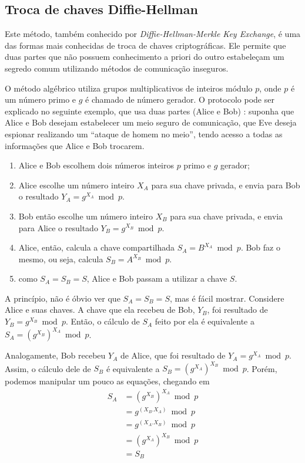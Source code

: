 
\subsection*{Troca de chaves Diffie-Hellman}

Este método, também conhecido por \emph{Diffie-Hellman-Merkle Key Exchange}, é uma das
formas mais conhecidas de troca de chaves criptográficas. Ele permite que duas partes
que não possuem conhecimento a priori do outro estabeleçam um segredo comum utilizando
métodos de comunicação inseguros.

O método algébrico utiliza grupos multiplicativos de inteiros módulo $p$, onde $p$ é um
número primo e $g$ é chamado de número gerador. O protocolo pode ser explicado no
seguinte exemplo, que usa duas partes (Alice e Bob)
\cite{book:schneier,artigo:diffiehellman}: suponha que Alice e Bob desejam estabelecer
um meio seguro de comunicação, que Eve deseja espionar realizando um ``ataque de homem
no meio'', tendo acesso a todas as informações que Alice e Bob trocarem.

\begin{enumerate}
    \item Alice e Bob escolhem dois números inteiros $p$ primo e $g$ gerador;

    \item Alice escolhe um número inteiro $X_{A}$ para sua chave privada, e envia para
        Bob o resultado $Y_{A} = g^{X_{A}} \bmod p$.

    \item Bob então escolhe um número inteiro $X_{B}$ para sua chave privada, e envia
        para Alice o resultado $Y_{B} = g^{X_{B}} \bmod p$.

    \item Alice, então, calcula a chave compartilhada $S_A = B^{X_{A}} \bmod p$. Bob faz
        o mesmo, ou seja, calcula $S_B = A^{X_{B}} \bmod p$.

    \item como $S_A = S_B = S$, Alice e Bob passam a utilizar a chave $S$.
\end{enumerate}

A princípio, não é óbvio ver que $S_A = S_B = S$, mas é fácil mostrar. Considere Alice e
suas chaves. A chave que ela recebeu de Bob, $Y_{B}$, foi resultado de
$Y_{B} = g^{X_{B}} \bmod p$. Então, o cálculo de $S_A$ feito por ela é equivalente a
$S_A = (g^{X_{B}})^{X_{A}} \bmod p$.

Analogamente, Bob recebeu $Y_{A}$ de Alice, que foi resultado de
$Y_{A} = g^{X_{A}} \bmod p$. Assim, o cálculo dele de $S_B$ é equivalente a
$S_B = (g^{X_{A}})^{X_{B}} \bmod p$. Porém, podemos manipular um pouco as equações,
chegando em
\begin{align*}
S_A & = (g^{X_{B}})^{X_{A}} \bmod p \\
    & = g^{(X_{B}.X_{A})}   \bmod p \\
    & = g^{(X_{A}.X_{B})}   \bmod p \\
    & = (g^{X_{A}})^{X_{B}} \bmod p \\
    & = S_B
\end{align*}

